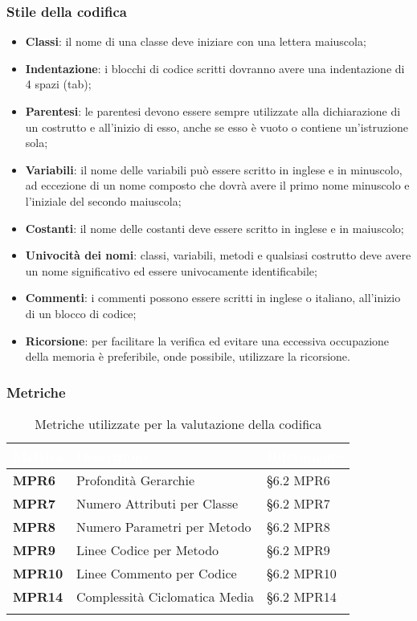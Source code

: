 \subsubsection{Stile della codifica}
\begin{itemize}
	\item \textbf{Classi}: il nome di una classe deve iniziare con una lettera maiuscola;
	\item \textbf{Indentazione}: i blocchi di codice scritti dovranno avere una indentazione di 4 spazi (tab);
	\item \textbf{Parentesi}: le parentesi devono essere sempre utilizzate alla dichiarazione di un costrutto e all'inizio di esso, anche se esso è vuoto o contiene un'istruzione sola;
	\item \textbf{Variabili}: il nome delle variabili può essere scritto in inglese e in minuscolo, ad eccezione di un nome composto che dovrà avere il primo nome minuscolo e l'iniziale del secondo maiuscola;
	\item \textbf{Costanti}: il nome delle costanti deve essere scritto in inglese e in maiuscolo;
	\item \textbf{Univocità dei nomi}: classi, variabili, metodi e qualsiasi costrutto deve avere un nome significativo ed essere univocamente identificabile; 
	\item \textbf{Commenti}: i commenti possono essere scritti in inglese o italiano, all'inizio di un blocco di codice;
	\item \textbf{Ricorsione}: per facilitare la verifica ed evitare una eccessiva occupazione della memoria è preferibile, onde possibile, utilizzare la ricorsione.
\end{itemize}

\subsubsection{Metriche}
\setlength{\freewidth}{\dimexpr\textwidth-0\tabcolsep}
\renewcommand{\arraystretch}{1.5}
\setlength{\aboverulesep}{0pt}
\setlength{\belowrulesep}{0pt}
\begin{longtable}{L{.22\freewidth} L{.4\freewidth} L{.2\freewidth}}
	\toprule
	\textcolor{white}{\textbf{Metrica}}&
	\textcolor{white}{\textbf{Descrizione}}&	
	\textcolor{white}{\textbf{Riferimento}}\\
	\toprule
	\endhead

	\textbf{MPR6} & Profondità Gerarchie &  \S6.2 MPR6 \\
	\textbf{MPR7} & Numero Attributi per Classe & \S 6.2 MPR7 \\
	\textbf{MPR8} & Numero Parametri per Metodo & \S 6.2 MPR8 \\
	\textbf{MPR9} & Linee Codice per Metodo & \S 6.2 MPR9 \\
	\textbf{MPR10} & Linee Commento per Codice & \S 6.2 MPR10 \\
	\textbf{MPR14} & Complessità Ciclomatica Media & \S 6.2 MPR14 \\

	\bottomrule
	\caption*{Metriche utilizzate per la valutazione della codifica}
\end{longtable}

